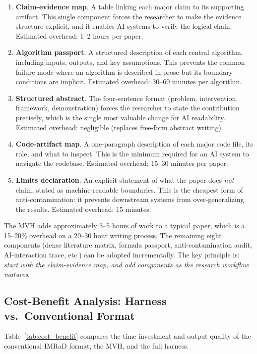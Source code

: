 \documentclass{article}
\newcommand{\revmark}{\marginpar{\footnotesize\textcolor{blue}{\textbf{Rev.\,2}}}}
\begin{document}
\begin{enumerate}
    \item \textbf{Claim-evidence map}. A table linking each major claim to its supporting artifact. This single component forces the researcher to make the evidence structure explicit, and it enables AI systems to verify the logical chain. Estimated overhead: 1--2 hours per paper.
    \item \textbf{Algorithm passport}. A structured description of each central algorithm, including inputs, outputs, and key assumptions. This prevents the common failure mode where an algorithm is described in prose but its boundary conditions are implicit. Estimated overhead: 30--60 minutes per algorithm.
    \item \textbf{Structured abstract}. The four-sentence format (problem, intervention, framework, demonstration) forces the researcher to state the contribution precisely, which is the single most valuable change for AI readability. Estimated overhead: negligible (replaces free-form abstract writing).
    \item \textbf{Code-artifact map}. A one-paragraph description of each major code file, its role, and what to inspect. This is the minimum required for an AI system to navigate the codebase. Estimated overhead: 15--30 minutes per paper.
    \item \textbf{Limits declaration}. An explicit statement of what the paper does \emph{not} claim, stated as machine-readable boundaries. This is the cheapest form of anti-contamination: it prevents downstream systems from over-generalizing the results. Estimated overhead: 15 minutes.
\end{enumerate}

The MVH adds approximately 3--5 hours of work to a typical paper, which is a 15--20\% overhead on a 20--30 hour writing process. The remaining eight components (dense literature matrix, formula passport, anti-contamination audit, AI-interaction trace, etc.) can be adopted incrementally. The key principle is: \emph{start with the claim-evidence map, and add components as the research workflow matures}.

\subsection{Cost-Benefit Analysis: Harness vs.\ Conventional Format}\revmark

Table~\ref{tab:cost_benefit} compares the time investment and output quality of the conventional IMRaD format, the MVH, and the full harness.
\end{document}
